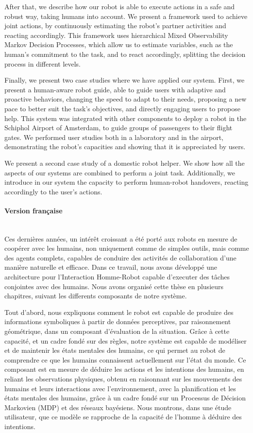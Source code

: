\documentclass[11pt, oneside]{Thesis} %
\begin{document}
{After that, we describe how our robot is able to execute actions in a safe and robust way, taking humans into account. We present a framework used to achieve joint actions, by continuously estimating the robot's partner activities and reacting accordingly. This framework uses hierarchical Mixed Observability Markov Decision Processes, which allow us to estimate variables, such as the human's commitment to the task, and to react accordingly, splitting the decision process in different levels.

Finally, we present two case studies where we have applied our system. First, we present a human-aware robot guide, able to guide users with adaptive and proactive behaviors, changing the speed to adapt to their needs, proposing a new pace to better suit the task's objectives, and directly engaging users to propose help. This system was integrated with other components to deploy a robot in the Schiphol Airport of Amsterdam, to guide groups of passengers to their flight gates. We performed user studies both in a laboratory and in the airport, demonstrating the robot's capacities and showing that it is appreciated by users. 

We present a second case study of a domestic robot helper. We show how all the aspects of our systems are combined to perform a joint task. Additionally, we introduce in our system the capacity to perform human-robot handovers, reacting accordingly to the user's actions.

\paragraph{Version fran\c caise}
~\\

Ces dernières années, un intérêt croissant a été porté aux robots en mesure de coopérer avec les humains, non uniquement comme de simples outils, mais comme des agents complets, capables de conduire des activités de collaboration d'une manière naturelle et efficace. Dans ce travail, nous avons développé une architecture pour l'Interaction Homme-Robot capable d'executer des tâches conjointes avec des humains. Nous avons organisé cette thèse en plusieurs chapitres, suivant les differents composants de notre système. 

Tout d'abord, nous expliquons comment le robot est capable de produire des informations symboliques à partir de données perceptives, par raisonnement géométrique, dans un composant d'évaluation de la situation. Grâce à cette capacité, et un cadre fondé sur des règles, notre système est capable de modéliser et de maintenir les états mentales des humains, ce qui permet au robot de comprendre ce que les humains connaissent actuellement sur l'état du monde. Ce composant est en mesure de déduire les actions et les intentions des humains, en reliant les observations physiques, obtenu en raisonnant sur les mouvements des humains et leurs interactions avec l'environnement,  avec la planification et les états mentales des humains, grâce à un cadre fondé sur un Processus de Décision Markovien (MDP) et des réseaux bayésiens. Nous montrons, dans une étude utilisateur, que ce modèle se rapproche de la capacité de l'homme à déduire des intentions. 

}
\end{document}
